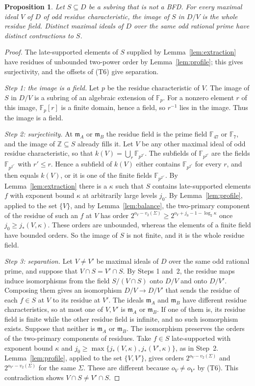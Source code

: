 \documentclass[11pt]{article}
\theoremstyle{plain}
\newtheorem{proposition}[theorem]{Proposition}
\theoremstyle{definition}
\theoremstyle{remark}
\newcommand{\Z}{\mathbb Z}
\newcommand{\F}{\mathbb F}
\newcommand{\EA}{\mathfrak m_A}
\newcommand{\EB}{\mathfrak m_B}
\begin{document}
\begin{proposition}\label{prop:residues}
Let $S\subseteq D$ be a subring that is not a BFD.  For every maximal
ideal $V$ of $D$ of odd residue characteristic, the image of $S$ in $D/V$
is the whole residue field.  Distinct maximal ideals of $D$ over the same
odd rational prime have distinct contractions to $S$.
\end{proposition}
\begin{proof}
The late-supported elements of $S$ supplied by
Lemma~\ref{lem:extraction} have residues of unbounded two-power order by
Lemma~\ref{lem:profile}; this gives surjectivity, and the offsets of (T6)
give separation.

\emph{Step 1: the image is a field.}  Let $p$ be the residue
characteristic of $V$.  The image of $S$ in $D/V$ is a subring of an
algebraic extension of $\F_p$.  For a nonzero element $r$ of this image,
$\F_p[r]$ is a finite domain, hence a field, so $r^{-1}$ lies in the
image.  Thus the image is a field.

\emph{Step 2: surjectivity.}  At $\EA$ or $\EB$ the residue field is the
prime field $\F_{47}$ or $\F_7$, and the image of $\Z\subseteq S$ already
fills it.  Let $V$ be any other maximal ideal of odd residue
characteristic, so that $k(V)=\bigcup_r\F_{p^{2^r}}$.  The subfields of
$\F_{p^{2^r}}$ are the fields $\F_{p^{2^{r'}}}$ with $r'\leq r$.  Hence a
subfield of $k(V)$ either contains $\F_{p^{2^r}}$ for every $r$, and then
equals $k(V)$, or it is one of the finite fields $\F_{p^{2^{r'}}}$.
By Lemma~\ref{lem:extraction} there is a $\kappa$ such that $S$ contains
late-supported elements $f$ with exponent bound $\kappa$ at arbitrarily
large levels $j_0$.  By Lemma~\ref{lem:profile}, applied to the set
$\{V\}$, and by Lemma~\ref{lem:balance}, the two-primary component of the
residue of such an $f$ at $V$ has order
$2^{o_V-v_2(\Sigma)}\geq2^{o_V+j_0-1-\log_2\kappa}$ once
$j_0\geq j_*(V,\kappa)$.  These orders are unbounded, whereas the elements
of a finite field have bounded orders.  So the image of $S$ is not
finite, and it is the whole residue field.

\emph{Step 3: separation.}  Let $V\neq V'$ be maximal ideals of $D$ over
the same odd rational prime, and suppose that $V\cap S=V'\cap S$.  By
Steps 1 and~2, the residue maps induce isomorphisms from the field
$S/(V\cap S)$ onto $D/V$ and onto $D/V'$.  Composing them gives an
isomorphism $D/V\to D/V'$ that sends the residue of each $f\in S$ at $V$
to its residue at $V'$.  The ideals $\EA$ and $\EB$ have different
residue characteristics, so at most one of $V,V'$ is $\EA$ or $\EB$.  If
one of them is, its residue field is finite while the other residue field
is infinite, and no such isomorphism exists.  Suppose that neither is
$\EA$ or $\EB$.  The isomorphism preserves the orders of the two-primary
components of residues.  Take $f\in S$ late-supported with exponent
bound $\kappa$ and $j_0\geq\max\{j_*(V,\kappa),j_*(V',\kappa)\}$, as in
Step~2.  Lemma~\ref{lem:profile}, applied to the set $\{V,V'\}$, gives
orders $2^{o_V-v_2(\Sigma)}$ and $2^{o_{V'}-v_2(\Sigma)}$ for the same
$\Sigma$.  These are different because $o_V\neq o_{V'}$ by (T6).  This
contradiction shows $V\cap S\neq V'\cap S$.
\end{proof}
\end{document}
